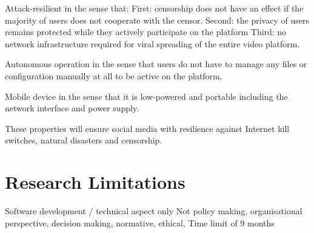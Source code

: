 Attack-resilient in the sense that:
First: censorship does not have an effect if the majority of users does not cooperate with the censor.
Second: the privacy of users remains protected while they actively participate on the platform
Third: no network infrastructure required for viral spreading of the entire video platform.

Autonomous operation in the sense that users do not have to manage any files or configuration manually at all to be active on the platform.

Mobile device in the sense that it is low-powered and portable including the network interface and power supply.

These properties will ensure social media with resilience against Internet kill switches, natural disasters and censorship.



\section{Research Limitations} %
Software development / technical aspect only
Not policy making, organisational perspective, decision making, normative, ethical,
Time limit of 9 months













